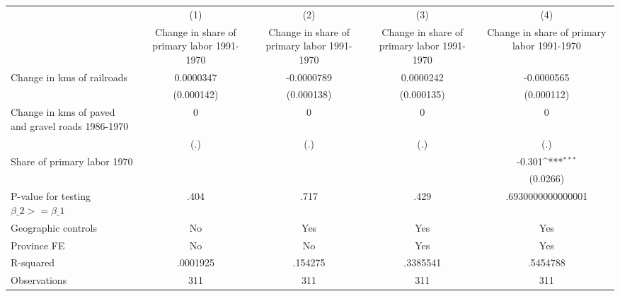 {
\def\sym#1{\ifmmode^{#1}\else\(^{#1}\)\fi}
\begin{tabular}{l*{4}{c}}
\hline\hline
                &\multicolumn{1}{c}{(1)}&\multicolumn{1}{c}{(2)}&\multicolumn{1}{c}{(3)}&\multicolumn{1}{c}{(4)}\\
                &\multicolumn{1}{c}{Change in share of primary labor 1991-1970}&\multicolumn{1}{c}{Change in share of primary labor 1991-1970}&\multicolumn{1}{c}{Change in share of primary labor 1991-1970}&\multicolumn{1}{c}{Change in share of primary labor 1991-1970}\\
\hline
Change in kms of railroads&0.0000347         &-0.0000789         &0.0000242         &-0.0000565         \\
                &(0.000142)         &(0.000138)         &(0.000135)         &(0.000112)         \\
[1em]
Change in kms of paved and gravel roads 1986-1970&        0         &        0         &        0         &        0         \\
                &      (.)         &      (.)         &      (.)         &      (.)         \\
[1em]
Share of primary labor 1970&                  &                  &                  &   -0.301\sym{***}\\
                &                  &                  &                  & (0.0266)         \\
\hline
P-value for testing $\beta\_{2} >= \beta\_{1}$&     .404         &     .717         &     .429         &.6930000000000001         \\
Geographic controls&       No         &      Yes         &      Yes         &      Yes         \\
Province FE     &       No         &       No         &      Yes         &      Yes         \\
R-squared       & .0001925         &  .154275         & .3385541         & .5454788         \\
Observations    &      311         &      311         &      311         &      311         \\
\hline\hline
\end{tabular}
}
